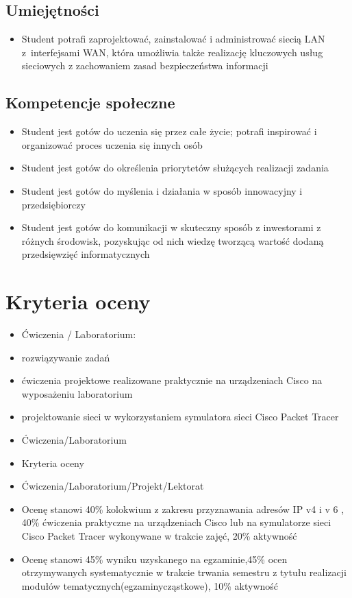 \documentclass[12pt, a4paper]{article}
\begin{document}
\subsection*{Umiejętności}
\begin{itemize}
  \item Student potrafi   zaprojektować, zainstalować i administrować siecią LAN z interfejsami WAN, która umożliwia także realizację kluczowych usług sieciowych z zachowaniem zasad bezpieczeństwa informacji
\end{itemize}

\subsection*{Kompetencje społeczne}
\begin{itemize}
  \item Student jest gotów do uczenia się przez całe życie; potrafi inspirować i organizować proces uczenia się innych osób
  \item Student jest gotów do określenia priorytetów służących realizacji zadania
  \item Student jest gotów do myślenia i działania w sposób innowacyjny i przedsiębiorczy
  \item Student jest gotów do komunikacji w skuteczny sposób z inwestorami z różnych środowisk, pozyskując od nich wiedzę tworzącą wartość dodaną przedsięwzięć informatycznych
\end{itemize}

\section{Kryteria oceny}

\begin{itemize}
  \item Ćwiczenia / Laboratorium:
  \item rozwiązywanie zadań
  \item ćwiczenia projektowe realizowane praktycznie na urządzeniach Cisco na wyposażeniu laboratorium
  \item projektowanie sieci w wykorzystaniem   symulatora sieci Cisco Packet Tracer
  \item Ćwiczenia/Laboratorium
  \item Kryteria oceny
  \item Ćwiczenia/Laboratorium/Projekt/Lektorat
  \item Ocenę stanowi 40\% kolokwium z zakresu przyznawania  adresów IP v4 i v 6  , 40\%  ćwiczenia praktyczne na urządzeniach Cisco  lub na symulatorze sieci Cisco Packet Tracer  wykonywane w trakcie zajęć, 20\% aktywność
  \item Ocenę stanowi 45\% wyniku uzyskanego na egzaminie,45\% ocen otrzymywanych systematycznie w trakcie trwania semestru z tytułu realizacji modułów tematycznych(egzaminycząstkowe), 10\% aktywność
\end{itemize}
\end{document}
